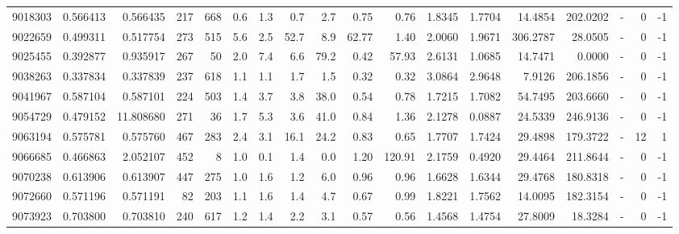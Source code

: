 \begin{tabular}{rrrrrrrrrrrrrrrlrr}
   9018303 & 0.566413 &   0.566435 &  217 &  668 &      0.6 &      1.3 &     0.7 &      2.7 &       0.75 &        0.76 &  1.8345 &  1.7704 &   14.4854 &  202.0202 &             - &        0 &         -1 \\
   9022659 & 0.499311 &   0.517754 &  273 &  515 &      5.6 &      2.5 &    52.7 &      8.9 &      62.77 &        1.40 &  2.0060 &  1.9671 &  306.2787 &   28.0505 &             - &        0 &         -1 \\
   9025455 & 0.392877 &   0.935917 &  267 &   50 &      2.0 &      7.4 &     6.6 &     79.2 &       0.42 &       57.93 &  2.6131 &  1.0685 &   14.7471 &    0.0000 &             - &        0 &         -1 \\
   9038263 & 0.337834 &   0.337839 &  237 &  618 &      1.1 &      1.1 &     1.7 &      1.5 &       0.32 &        0.32 &  3.0864 &  2.9648 &    7.9126 &  206.1856 &             - &        0 &         -1 \\
   9041967 & 0.587104 &   0.587101 &  224 &  503 &      1.4 &      3.7 &     3.8 &     38.0 &       0.54 &        0.78 &  1.7215 &  1.7082 &   54.7495 &  203.6660 &             - &        0 &         -1 \\
   9054729 & 0.479152 &  11.808680 &  271 &   36 &      1.7 &      5.3 &     3.6 &     41.0 &       0.84 &        1.36 &  2.1278 &  0.0887 &   24.5339 &  246.9136 &             - &        0 &         -1 \\
   9063194 & 0.575781 &   0.575760 &  467 &  283 &      2.4 &      3.1 &    16.1 &     24.2 &       0.83 &        0.65 &  1.7707 &  1.7424 &   29.4898 &  179.3722 &             - &       12 &          1 \\
   9066685 & 0.466863 &   2.052107 &  452 &    8 &      1.0 &      0.1 &     1.4 &      0.0 &       1.20 &      120.91 &  2.1759 &  0.4920 &   29.4464 &  211.8644 &             - &        0 &         -1 \\
   9070238 & 0.613906 &   0.613907 &  447 &  275 &      1.0 &      1.6 &     1.2 &      6.0 &       0.96 &        0.96 &  1.6628 &  1.6344 &   29.4768 &  180.8318 &             - &        0 &         -1 \\
   9072660 & 0.571196 &   0.571191 &   82 &  203 &      1.1 &      1.6 &     1.4 &      4.7 &       0.67 &        0.99 &  1.8221 &  1.7562 &   14.0095 &  182.3154 &             - &        0 &         -1 \\
   9073923 & 0.703800 &   0.703810 &  240 &  617 &      1.2 &      1.4 &     2.2 &      3.1 &       0.57 &        0.56 &  1.4568 &  1.4754 &   27.8009 &   18.3284 &             - &        0 &         -1 \\

\end{tabular}
